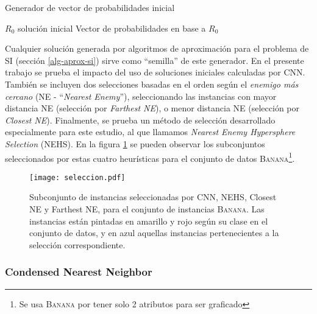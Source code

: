 \begin{algorithm}
\caption{Generador de vector de probabilidades inicial}
\label{inicial-sol-alg}
\begin{algorithmic}[1]

\Require $R_0$ solución inicial
\Ensure Vector de probabilidades en base a $R_0$

	\Else
	\EndIf
\EndFor
\State {}
\end{algorithmic}
\end{algorithm}

Cualquier solución generada por algoritmos de aproximación para el problema de SI (sección \ref{alg-aprox-si}) sirve como ``semilla'' de este generador. En el presente trabajo se prueba el impacto del uso de soluciones iniciales calculadas por CNN. También se incluyen dos selecciones basadas en el orden según el \emph{enemigo más cercano} (NE - ``\emph{Nearest Enemy}''), seleccionando las instancias con mayor distancia NE (selección por \emph{Farthest NE}), o menor distancia NE (selección por \emph{Closest NE}). Finalmente, se prueba un método de selección desarrollado especialmente para este estudio, al que llamamos \emph{Nearest Enemy Hypersphere Selection} (NEHS). En la figura \ref{seleccion} se pueden observar los subconjuntos seleccionados por estas cuatro heurísticas para el conjunto de datos \textsc{Banana}\footnote{Se usa \textsc{Banana} por tener solo 2 atributos para ser graficado}.

\begin{figure}[h!]
\centering
\texttt{[image: seleccion.pdf]}
\caption[Algoritmos de Selección de Instancias]{Subconjunto de instancias seleccionadas por CNN, NEHS, Closest NE y Farthest NE, para el conjunto de instancias \textsc{Banana}. Las instancias están pintadas en amarillo y rojo según su clase en el conjunto de datos, y en azul aquellas instancias pertenecientes a la selección correspondiente.}
\label{seleccion}
\end{figure}

\subsubsection{Condensed Nearest Neighbor}

